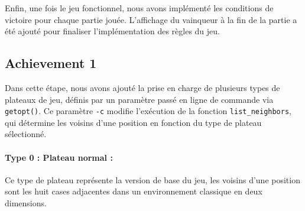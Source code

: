 \documentclass[a4paper,12pt]{report}
\begin{document}
Enfin, une fois le jeu fonctionnel, nous avons implémenté les conditions de victoire pour chaque partie jouée. L'affichage du vainqueur à la fin de la partie a été ajouté pour finaliser l'implémentation des règles du jeu.

\subsection{Achievement 1}
Dans cette étape, nous avons ajouté la prise en charge de plusieurs types de plateaux de jeu, définis par un 
paramètre passé en ligne de commande via \texttt{getopt()}. Ce paramètre \texttt{-c} modifie l'exécution de 
la fonction \texttt{list\_neighbors}, qui détermine les voisins d'une position en fonction du type de plateau 
sélectionné.

\paragraph{Type 0 : Plateau normal :} 
Ce type de plateau représente la version de base du jeu, les voisins d'une position sont les huit 
cases adjacentes dans un environnement classique en deux dimensions.

\begin{center}
\end{center}
\end{document}
